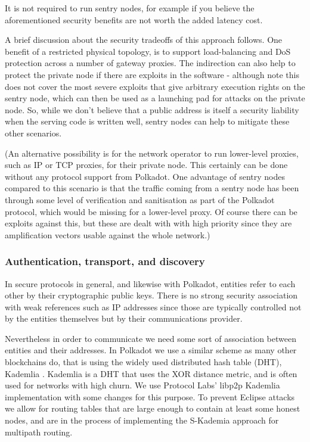 \documentclass{article}
\begin{document}
It is not required to run sentry nodes, for example if you believe the
aforementioned security benefits are not worth the added latency cost.

A brief discussion about the security tradeoffs of this approach follows. One
benefit of a restricted physical topology, is to support load-balancing and DoS
protection across a number of gateway proxies. The indirection can also help to
protect the private node if there are exploits in the software - although note
this does not cover the most severe exploits that give arbitrary execution
rights on the sentry node, which can then be used as a launching pad for
attacks on the private node. So, while we don't believe that a public address
is itself a security liability when the serving code is written well, sentry
nodes can help to mitigate these other scenarios.

(An alternative possibility is for the network operator to run lower-level
proxies, such as IP or TCP proxies, for their private node. This certainly can
be done without any protocol support from Polkadot. One advantage of sentry
nodes compared to this scenario is that the traffic coming from a sentry node
has been through some level of verification and sanitisation as part of the
Polkadot protocol, which would be missing for a lower-level proxy. Of course
there can be exploits against this, but these are dealt with with high priority
since they are amplification vectors usable against the whole network.)

\subsubsection{Authentication, transport, and discovery} \label{sec:net_lowlevel}

In secure protocols in general, and likewise with Polkadot, entities refer to each other by their cryptographic public keys. There is no strong security association with weak references such as IP addresses since those are typically controlled not by the entities themselves but by their communications provider.

Nevertheless in order to communicate we need some sort of association between entities and their addresses. In Polkadot we use a similar scheme as many other blockchains do, that is using the widely used distributed hash table (DHT), Kademlia \cite{Maymounkov:2002:Kademila}. Kademlia is a DHT that uses the XOR distance metric, and is often used for networks with high churn. We use Protocol Labs' libp2p Kademlia implementation with some changes for this purpose. To prevent Eclipse attacks \cite{eclipseattack} we allow for routing tables that are large enough to contain at least some honest nodes, and are in the process of implementing the S-Kademia approach for multipath routing.
\end{document}
